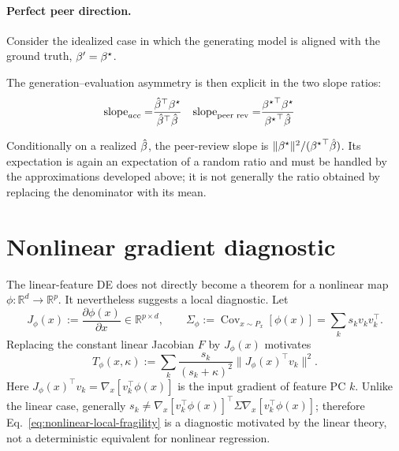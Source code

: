 \paragraph{Perfect peer direction.}

Consider the idealized case in which the generating model is aligned with the
ground truth, ${\beta^{\prime}}={\beta^{\star}}$.

The generation--evaluation asymmetry is then explicit in the two slope ratios:
\begin{align*}
\mathrm{slope}_{acc}= & \frac{{\hat{\beta}}^{\top}{\beta^{\star}}}{{\hat{\beta}}^{\top}\hat{\beta}} & \mathrm{slope}_{\text{peer rev}}= & \frac{{{\beta^{\star}}}^{\top}{\beta^{\star}}}{{{\beta^{\star}}}^{\top}\hat{\beta}}
\end{align*}

Conditionally on a realized $\hat{\beta}$, the peer-review slope is
$\|{\beta^{\star}}\|^2/({{\beta^{\star}}}^\top\hat{\beta})$. Its expectation is again an expectation
of a random ratio and must be handled by the approximations developed above;
it is not generally the ratio obtained by replacing the denominator with its
mean.




\section{Nonlinear gradient diagnostic}
\label{sec:app-nonlinear-diagnostic}
\label{sec:app-nonlinear-feature-diagnostic}

The linear-feature DE does not directly become a theorem for a nonlinear
map $\phi:\mathbb R^d\to\mathbb R^p$.  It nevertheless suggests a local
diagnostic.  Let
\begin{equation}
  J_\phi(x):=\frac{\partial\phi(x)}{\partial x}\in\mathbb R^{p\times d},
  \qquad
  \Sigma_\phi:=\operatorname{Cov}_{x\sim P_x}[\phi(x)]
  =\sum_k s_kv_kv_k^\top.
\end{equation}
Replacing the constant linear Jacobian $F$ by $J_\phi(x)$ motivates
\begin{equation}
  T_\phi(x,\kappa)
  :=\sum_k\frac{s_k}{(s_k+\kappa)^2}
       \|J_\phi(x)^\top v_k\|^2.
  \label{eq:nonlinear-local-fragility}
\end{equation}
Here $J_\phi(x)^\top v_k=\nabla_x[v_k^\top\phi(x)]$ is the input gradient
of feature PC $k$.  Unlike the linear case, generally
$s_k\neq\nabla_x[v_k^\top\phi(x)]^\top\Sigma
\nabla_x[v_k^\top\phi(x)]$; therefore Eq.~\ref{eq:nonlinear-local-fragility}
is a diagnostic motivated by the linear theory, not a deterministic
equivalent for nonlinear regression.

